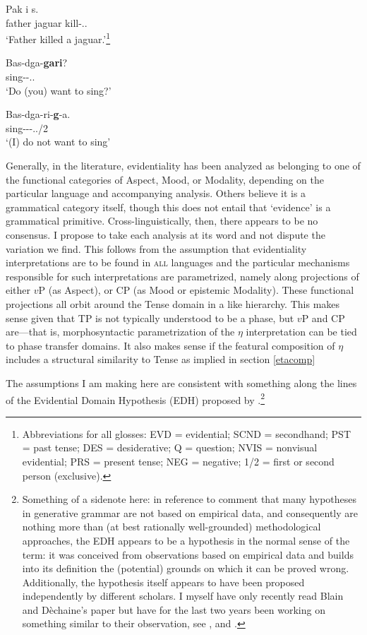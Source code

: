 \documentclass[11pt]{article}
\begin{document}
 \begin{exe}
\ex 
\gll Pak i  s. \\
father jaguar  kill-\evd.\Scnd.\m\sg \\ 
\glt `Father killed a jaguar.'\footnote{Abbreviations for all glosses: EVD = evidential; SCND = secondhand; PST = past tense; DES = desiderative; Q = question; NVIS = nonvisual evidential; PRS = present tense; NEG = negative; 1/2 = first or second person (exclusive).} 

\ex
\gll Bas-dga-{\bf gari}?\\
     sing-\Des-\Q.\Nvis.\prs\\
\glt `Do (you) want to sing?'

\ex
\gll Bas-dga-ri-{\bf g}-a.\\
     sing-\Des-\Neg-\evd.\Nvis./2\\
\glt `(I) do not want to sing'
\end{exe}

Generally, in the literature, evidentiality has been analyzed as belonging to one of the functional categories of Aspect, Mood, or Modality, depending on the particular language and accompanying analysis. Others believe it is a grammatical category itself, though this does not entail that `evidence' is a grammatical primitive. Cross-linguistically, then, there appears to be no consensus. I propose to take each analysis at its word and not dispute the variation we find. This follows from the assumption that evidentiality interpretations are to be found in \textsc{all} languages and the particular mechanisms responsible for such interpretations are parametrized, namely along projections of either $v$P (as Aspect), or CP (as Mood or epistemic Modality). These functional projections all orbit around the Tense domain in a \cite{cinque99adverbs} like hierarchy. This makes sense given that TP is not typically understood to be a phase, but $v$P and CP are---that is, morphosyntactic parametrization of the $\eta$ interpretation can be tied to phase transfer domains. It also makes sense if the featural composition of $\eta$ includes a structural similarity to Tense as implied in section \ref{etacomp}

The assumptions I am making here are consistent with something along the lines of the Evidential Domain Hypothesis (EDH) proposed by \cite{blaindechaine07evdtypes}.\footnote{Something of a sidenote here: in reference to  comment that many hypotheses in generative grammar are not based on empirical data, and consequently are nothing more than (at best rationally well-grounded) methodological approaches, the EDH appears to be a hypothesis in the normal sense of the term: it was conceived from observations based on empirical data and builds into its definition the (potential) grounds on which it can be proved wrong. Additionally, the hypothesis itself appears to have been proposed independently by different scholars. I myself have only recently read Blain and D\`echaine's paper but have for the last two years been working on something similar to their observation, see \cite{bowles07phieta},  and .}
\end{document}
